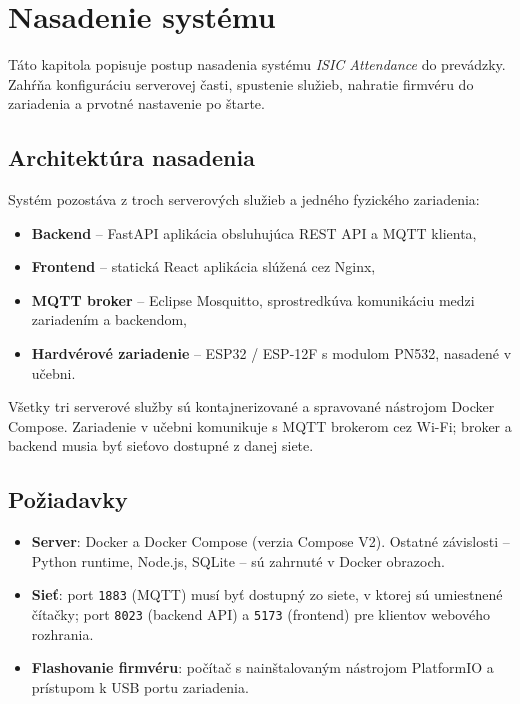 \chapter{Nasadenie systému}
\label{chap:deployment}

Táto kapitola popisuje postup nasadenia systému \textit{ISIC Attendance} do prevádzky. Zahŕňa konfiguráciu serverovej časti, spustenie služieb, nahratie firmvéru do zariadenia a prvotné nastavenie po štarte.

\section{Architektúra nasadenia}
\label{sec:deployment-architecture}

Systém pozostáva z troch serverových služieb a jedného fyzického zariadenia:

\begin{itemize}
    \item \textbf{Backend} -- FastAPI aplikácia obsluhujúca REST API a MQTT klienta,
    \item \textbf{Frontend} -- statická React aplikácia slúžená cez Nginx,
    \item \textbf{MQTT broker} -- Eclipse Mosquitto, sprostredkúva komunikáciu medzi zariadením a backendom,
    \item \textbf{Hardvérové zariadenie} -- ESP32 / ESP-12F s modulom PN532, nasadené v učebni.
\end{itemize}

Všetky tri serverové služby sú kontajnerizované a spravované nástrojom Docker Compose. Zariadenie v učebni komunikuje s MQTT brokerom cez Wi-Fi; broker a backend musia byť sieťovo dostupné z danej siete.

\section{Požiadavky}
\label{sec:deployment-requirements}

\begin{itemize}
    \item \textbf{Server}: Docker a Docker Compose (verzia Compose V2). Ostatné závislosti -- Python runtime, Node.js, SQLite -- sú zahrnuté v Docker obrazoch.
    \item \textbf{Sieť}: port \texttt{1883} (MQTT) musí byť dostupný zo siete, v ktorej sú umiestnené čítačky; port \texttt{8023} (backend API) a \texttt{5173} (frontend) pre klientov webového rozhrania.
    \item \textbf{Flashovanie firmvéru}: počítač s nainštalovaným nástrojom PlatformIO a prístupom k USB portu zariadenia.
\end{itemize}

